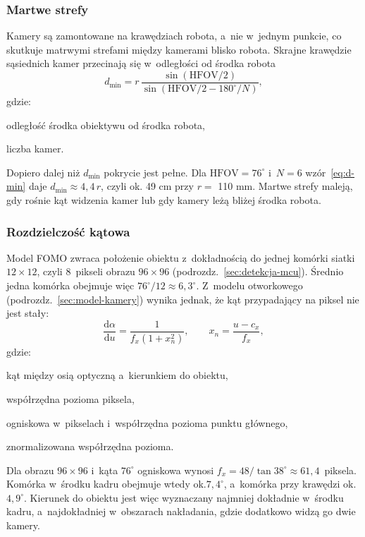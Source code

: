 \subsubsection*{Martwe strefy}
Kamery są zamontowane na krawędziach robota, a~nie w~jednym punkcie, co skutkuje matrwymi strefami między kamerami blisko robota. Skrajne krawędzie sąsiednich kamer przecinają się w~odległości od środka robota
\begin{equation}
  d_{\min} = r \, \frac{\sin\left(\mathrm{HFOV}/2\right)}
             {\sin\left(\mathrm{HFOV}/2 - 180^\circ/N\right)},
  \label{eq:d-min}
\end{equation}
\noindent gdzie:
\begin{eqwhere}[1cm]
  \item[$r$] odległość środka obiektywu od środka robota,
  \item[$N$] liczba kamer.
\end{eqwhere}

Dopiero dalej niż $d_{\min}$ pokrycie jest pełne. Dla $\mathrm{HFOV} =
76^\circ$ i~$N = 6$ wzór~\eqref{eq:d-min} daje $d_{\min} \approx 4{,}4\,r$,
czyli ok. 49 cm przy $r =$ 110 mm. Martwe strefy maleją, gdy rośnie kąt
widzenia kamer lub gdy kamery leżą bliżej środka robota.

\subsubsection*{Rozdzielczość kątowa}

Model FOMO zwraca położenie obiektu z~dokładnością do jednej komórki
siatki $12 \times 12$, czyli 8~pikseli obrazu $96 \times 96$
(podrozdz.~\ref{sec:detekcja-mcu}). Średnio jedna komórka obejmuje więc
$76^\circ / 12 \approx 6{,}3^\circ$. Z~modelu otworkowego
(podrozdz.~\ref{sec:model-kamery}) wynika jednak, że kąt przypadający na
piksel nie jest stały:
\begin{equation}
  \frac{\mathrm{d}\alpha}{\mathrm{d}u} = \frac{1}{f_x \left(1 + x_n^2\right)},
  \qquad x_n = \frac{u - c_x}{f_x},
  \label{eq:rozdzielczosc-katowa}
\end{equation}
\noindent gdzie:
\begin{eqwhere}[1cm]
  \item[$\alpha$] kąt między osią optyczną a~kierunkiem do obiektu,
  \item[$u$] współrzędna pozioma piksela,
  \item[$f_x$, $c_x$] ogniskowa w~pikselach i~współrzędna pozioma punktu
        głównego,
  \item[$x_n$] znormalizowana współrzędna pozioma.
\end{eqwhere}
Dla obrazu $96 \times 96$ i~kąta $76^\circ$ ogniskowa wynosi
$f_x = 48 / \tan 38^\circ \approx 61{,}4$~piksela. Komórka w~środku kadru
obejmuje wtedy ok.$7{,}4^\circ$, a~komórka przy krawędzi ok.$4{,}9^\circ$.
Kierunek do obiektu jest więc wyznaczany najmniej dokładnie w~środku
kadru, a~najdokładniej w~obszarach nakładania, gdzie dodatkowo widzą go
dwie kamery.

